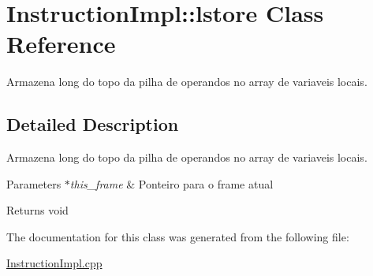 \hypertarget{class_instruction_impl_1_1lstore}{}\section{Instruction\+Impl\+:\+:lstore Class Reference}
\label{class_instruction_impl_1_1lstore}


Armazena long do topo da pilha de operandos no array de variaveis locais.  




\subsection{Detailed Description}
Armazena long do topo da pilha de operandos no array de variaveis locais. 


\begin{DoxyParams}{Parameters}
{\em $\ast$this\+\_\+frame} & Ponteiro para o frame atual \\
\hline
\end{DoxyParams}
\begin{DoxyReturn}{Returns}
void 
\end{DoxyReturn}


The documentation for this class was generated from the following file\+:\begin{DoxyCompactItemize}
\item 
\hyperlink{_instruction_impl_8cpp}{Instruction\+Impl.\+cpp}\end{DoxyCompactItemize}
